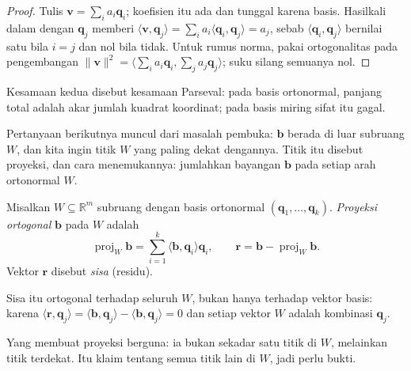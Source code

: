 \begin{proof}
Tulis $\mathbf{v}=\sum_{i}a_{i}\mathbf{q}_{i}$; koefisien itu ada dan tunggal karena
basis. Hasilkali dalam dengan $\mathbf{q}_{j}$ memberi
$\langle\mathbf{v},\mathbf{q}_{j}\rangle=\sum_{i}a_{i}\langle\mathbf{q}_{i},\mathbf{q}_{j}\rangle
=a_{j}$, sebab $\langle\mathbf{q}_{i},\mathbf{q}_{j}\rangle$ bernilai satu bila $i=j$
dan nol bila tidak. Untuk rumus norma, pakai ortogonalitas pada pengembangan
$\|\mathbf{v}\|^{2}=\langle\sum_{i}a_{i}\mathbf{q}_{i},\sum_{j}a_{j}\mathbf{q}_{j}\rangle$;
suku silang semuanya nol.
\end{proof}

Kesamaan kedua disebut kesamaan Parseval: pada basis ortonormal, panjang total adalah
akar jumlah kuadrat koordinat; pada basis miring sifat itu gagal.

Pertanyaan berikutnya muncul dari masalah pembuka: $\mathbf{b}$ berada di luar subruang
$W$, dan kita ingin titik $W$ yang paling dekat dengannya. Titik itu disebut proyeksi,
dan cara menemukannya: jumlahkan bayangan $\mathbf{b}$ pada setiap arah ortonormal $W$.


\begin{definisi}
Misalkan $W\subseteq\mathbb{R}^{m}$ subruang dengan basis ortonormal
$(\mathbf{q}_{1},\dots,\mathbf{q}_{k})$. \emph{Proyeksi ortogonal} $\mathbf{b}$ pada $W$
adalah
\[
  \operatorname{proj}_{W}\mathbf{b}=\sum_{i=1}^{k}\langle\mathbf{b},\mathbf{q}_{i}\rangle\mathbf{q}_{i},
  \qquad
  \mathbf{r}=\mathbf{b}-\operatorname{proj}_{W}\mathbf{b}.
\]
Vektor $\mathbf{r}$ disebut \emph{sisa} (residu).
\end{definisi}

Sisa itu ortogonal terhadap seluruh $W$, bukan hanya terhadap vektor basis: karena
$\langle\mathbf{r},\mathbf{q}_{j}\rangle=\langle\mathbf{b},\mathbf{q}_{j}\rangle
-\langle\mathbf{b},\mathbf{q}_{j}\rangle=0$ dan setiap vektor $W$ adalah kombinasi
$\mathbf{q}_{j}$.

Yang membuat proyeksi berguna: ia bukan sekadar satu titik di $W$, melainkan titik
terdekat. Itu klaim tentang semua titik lain di $W$, jadi perlu bukti.

